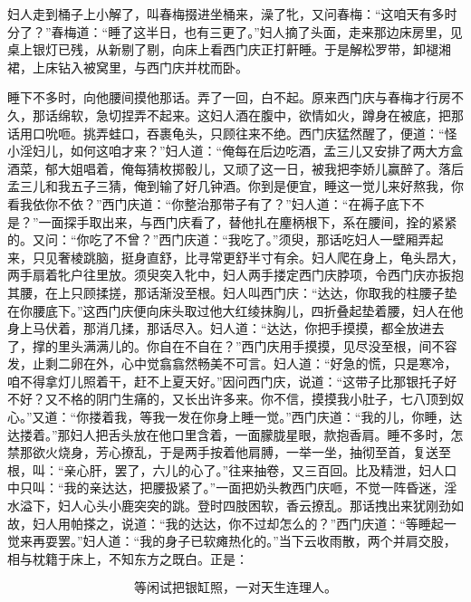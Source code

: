 妇人走到桶子上小解了，叫春梅掇进坐桶来，澡了牝，又问春梅：“这咱天有多时分了？”春梅道：“睡了这半日，也有三更了。”妇人摘了头面，走来那边床房里，见桌上银灯已残，从新剔了剔，向床上看西门庆正打鼾睡。于是解松罗带，卸褪湘裙，上床钻入被窝里，与西门庆并枕而卧。

睡下不多时，向他腰间摸他那话。弄了一回，白不起。原来西门庆与春梅才行房不久，那话绵软，急切捏弄不起来。这妇人酒在腹中，欲情如火，蹲身在被底，把那话用口吮咂。挑弄蛙口，吞裹龟头，只顾往来不绝。西门庆猛然醒了，便道：“怪小淫妇儿，如何这咱才来？”妇人道：“俺每在后边吃酒，孟三儿又安排了两大方盒酒菜，郁大姐唱着，俺每猜枚掷骰儿，又顽了这一日，被我把李娇儿赢醉了。落后孟三儿和我五子三猜，俺到输了好几钟酒。你到是便宜，睡这一觉儿来好熬我，你看我依你不依？”西门庆道：“你整治那带子有了？”妇人道：“在褥子底下不是？”一面探手取出来，与西门庆看了，替他扎在麈柄根下，系在腰间，拴的紧紧的。又问：“你吃了不曾？”西门庆道：“我吃了。”须臾，那话吃妇人一壁厢弄起来，只见奢棱跳脑，挺身直舒，比寻常更舒半寸有余。妇人爬在身上，龟头昂大，两手扇着牝户往里放。须臾突入牝中，妇人两手搂定西门庆脖项，令西门庆亦扳抱其腰，在上只顾揉搓，那话渐没至根。妇人叫西门庆：“达达，你取我的柱腰子垫在你腰底下。”这西门庆便向床头取过他大红绫抹胸儿，四折叠起垫着腰，妇人在他身上马伏着，那消几揉，那话尽入。妇人道：“达达，你把手摸摸，都全放进去了，撑的里头满满儿的。你自在不自在？”西门庆用手摸摸，见尽没至根，间不容发，止剩二卵在外，心中觉翕翕然畅美不可言。妇人道：“好急的慌，只是寒冷，咱不得拿灯儿照着干，赶不上夏天好。”因问西门庆，说道：“这带子比那银托子好不好？又不格的阴门生痛的，又长出许多来。你不信，摸摸我小肚子，七八顶到奴心。”又道：“你搂着我，等我一发在你身上睡一觉。”西门庆道：“我的儿，你睡，达达搂着。”那妇人把舌头放在他口里含着，一面朦胧星眼，款抱香肩。睡不多时，怎禁那欲火烧身，芳心撩乱，于是两手按着他肩膊，一举一坐，抽彻至首，复送至根，叫：“亲心肝，罢了，六儿的心了。”往来抽卷，又三百回。比及精泄，妇人口中只叫：“我的亲达达，把腰扱紧了。”一面把奶头教西门庆咂，不觉一阵昏迷，淫水溢下，妇人心头小鹿突突的跳。登时四肢困软，香云撩乱。那话拽出来犹刚劲如故，妇人用帕搽之，说道：“我的达达，你不过却怎么的？”西门庆道：“等睡起一觉来再耍罢。”妇人道：“我的身子已软瘫热化的。”当下云收雨散，两个并肩交股，相与枕籍于床上，不知东方之既白。正是：

\[
等闲试把银缸照，一对天生连理人。
\]
